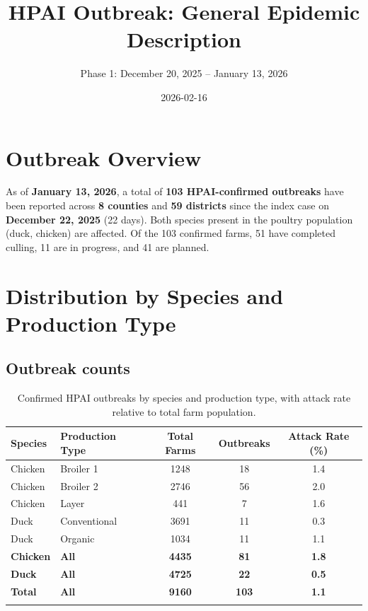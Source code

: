 \documentclass[
]{article}
\title{HPAI Outbreak: General Epidemic Description}
\subtitle{Phase 1: December 20, 2025 -- January 13, 2026}
\author{}
\date{2026-02-16}
\renewcommand*\contentsname{Table of contents}
\newcommand\contentsname{Table of contents}
\begin{document}
\maketitle

\renewcommand*\contentsname{Table of contents}
{
\hypersetup{linkcolor=}
\setcounter{tocdepth}{3}
\tableofcontents
}

\section{Outbreak Overview}\label{outbreak-overview}

As of \textbf{January 13, 2026}, a total of \textbf{103 HPAI-confirmed
outbreaks} have been reported across \textbf{8 counties} and \textbf{59
districts} since the index case on \textbf{December 22, 2025} (22 days).
Both species present in the poultry population (duck, chicken) are
affected. Of the 103 confirmed farms, 51 have completed culling, 11 are
in progress, and 41 are planned.

\section{Distribution by Species and Production
Type}\label{distribution-by-species-and-production-type}

\subsection{Outbreak counts}\label{outbreak-counts}

\begin{longtable}[t]{llccc}

\caption{\label{tbl-species-production}Confirmed HPAI outbreaks by
species and production type, with attack rate relative to total farm
population.}

\tabularnewline

\toprule
Species & Production Type & Total Farms & Outbreaks & Attack Rate (\%)\\
\midrule
Chicken & Broiler 1 & 1248 & 18 & 1.4\\
Chicken & Broiler 2 & 2746 & 56 & 2.0\\
Chicken & Layer & 441 & 7 & 1.6\\
Duck & Conventional & 3691 & 11 & 0.3\\
Duck & Organic & 1034 & 11 & 1.1\\
\addlinespace
\textbf{Chicken} & \textbf{All} & \textbf{4435} & \textbf{81} & \textbf{1.8}\\
\textbf{Duck} & \textbf{All} & \textbf{4725} & \textbf{22} & \textbf{0.5}\\
\textbf{Total} & \textbf{All} & \textbf{9160} & \textbf{103} & \textbf{1.1}\\
\midrule\\
\bottomrule

\end{longtable}
\end{document}
